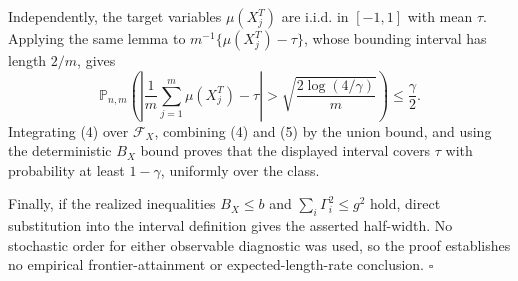 Independently, the target variables \(\mu(X_j^T)\) are i.i.d. in \([-1,1]\) with mean \(\tau\). Applying the same lemma to \(m^{-1}\{\mu(X_j^T)-\tau\}\), whose bounding interval has length \(2/m\), gives
\[
\mathbb P_{n,m}\!\left(
\left|\frac1m\sum_{j=1}^m\mu(X_j^T)-\tau\right|>
\sqrt{\frac{2\log(4/\gamma)}m}\right)\le\frac\gamma2.
\tag{5}
\]
Integrating (4) over \(\mathcal F_X\), combining (4) and (5) by the union bound, and using the deterministic \(B_X\) bound proves that the displayed interval covers \(\tau\) with probability at least \(1-\gamma\), uniformly over the class.

Finally, if the realized inequalities \(B_X\le b\) and \(\sum_i\Gamma_i^2\le g^2\) hold, direct substitution into the interval definition gives the asserted half-width. No stochastic order for either observable diagnostic was used, so the proof establishes no empirical frontier-attainment or expected-length-rate conclusion. \(\square\)